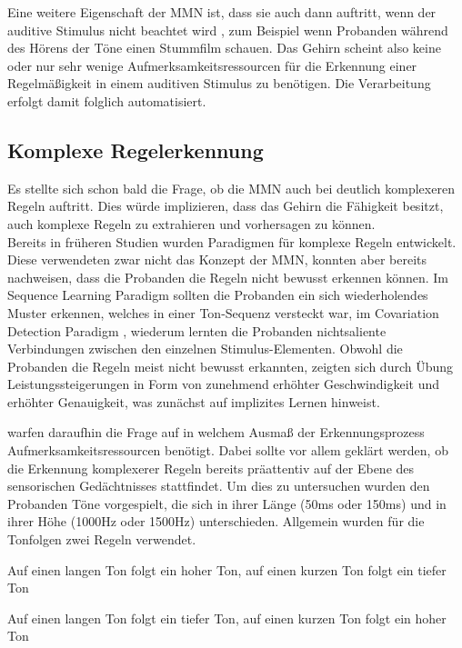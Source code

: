 \documentclass[doc,a4paper,12pt]{apa6}
\begin{document}
Eine weitere Eigenschaft der MMN ist, dass sie auch dann auftritt, wenn der auditive Stimulus nicht beachtet wird \parencite{naatanen2007mismatch}, zum Beispiel wenn Probanden während des Hörens der Töne einen Stummfilm schauen. Das Gehirn scheint also keine oder nur sehr wenige Aufmerksamkeitsressourcen für die Erkennung einer Regelmäßigkeit in einem auditiven Stimulus zu benötigen. Die Verarbeitung erfolgt damit folglich automatisiert.

\subsection{Komplexe Regelerkennung}

Es stellte sich schon bald die Frage, ob die MMN auch bei deutlich komplexeren Regeln auftritt. Dies würde implizieren, dass das Gehirn die Fähigkeit besitzt, auch komplexe Regeln zu extrahieren und vorhersagen zu können.\\
Bereits in früheren Studien wurden Paradigmen für komplexe Regeln entwickelt. Diese verwendeten zwar nicht das Konzept der MMN, konnten aber bereits nachweisen, dass die Probanden die Regeln nicht bewusst erkennen können. Im Sequence Learning Paradigm \parencite{hoffmann1998implicit} sollten die Probanden ein sich wiederholendes Muster erkennen, welches in einer Ton-Sequenz versteckt war, im Covariation Detection Paradigm \parencite{stamov2001revealing}, wiederum lernten die Probanden nichtsaliente Verbindungen zwischen den einzelnen Stimulus-Elementen. Obwohl die Probanden die Regeln meist nicht bewusst erkannten, zeigten sich durch Übung Leistungssteigerungen in Form von zunehmend erhöhter Geschwindigkeit und erhöhter Genauigkeit, was zunächst auf implizites Lernen hinweist.

\textcite{paavilainen2007preattentive} warfen daraufhin die Frage auf in welchem Ausmaß der Erkennungsprozess Aufmerksamkeitsressourcen benötigt. Dabei sollte vor allem geklärt werden, ob die Erkennung komplexerer Regeln bereits präattentiv auf der Ebene des sensorischen Gedächtnisses stattfindet. Um dies zu untersuchen wurden den Probanden Töne vorgespielt, die sich in ihrer Länge (50ms oder 150ms) und in ihrer Höhe (1000Hz oder 1500Hz) unterschieden. Allgemein wurden für die Tonfolgen zwei Regeln verwendet.

\begin{compactitem}
  \item Auf einen langen Ton folgt ein hoher Ton, auf einen kurzen Ton folgt ein tiefer
Ton
  \item Auf einen langen Ton folgt ein tiefer Ton, auf einen kurzen Ton folgt ein hoher
Ton
\end{compactitem}
\end{document}
